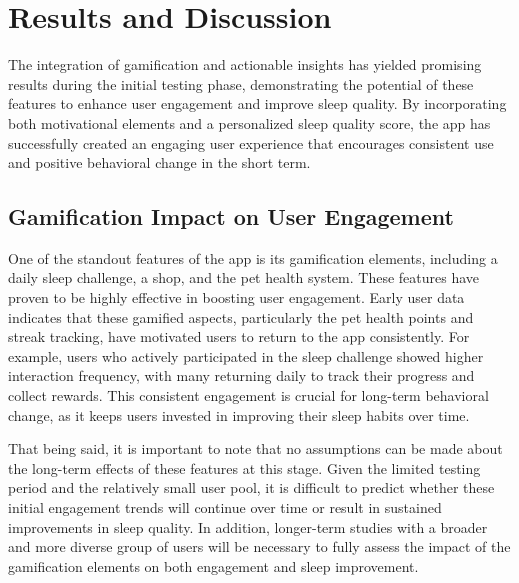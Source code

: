 \documentclass[10pt,twocolumn]{article}
\begin{document}
\section{Results and Discussion}

The integration of gamification and actionable insights has yielded promising results during the initial testing phase, demonstrating the potential of these features to enhance user engagement and improve sleep quality. By incorporating both motivational elements and a personalized sleep quality score, the app has successfully created an engaging user experience that encourages consistent use and positive behavioral change in the short term.

\subsection{Gamification Impact on User Engagement} One of the standout features of the app is its gamification elements, including a daily sleep challenge, a shop, and the pet health system. These features have proven to be highly effective in boosting user engagement. Early user data indicates that these gamified aspects, particularly the pet health points and streak tracking, have motivated users to return to the app consistently. For example, users who actively participated in the sleep challenge showed higher interaction frequency, with many returning daily to track their progress and collect rewards. This consistent engagement is crucial for long-term behavioral change, as it keeps users invested in improving their sleep habits over time.

That being said, it is important to note that no assumptions can be made about the long-term effects of these features at this stage. Given the limited testing period and the relatively small user pool, it is difficult to predict whether these initial engagement trends will continue over time or result in sustained improvements in sleep quality. In addition, longer-term studies with a broader and more diverse group of users will be necessary to fully assess the impact of the gamification elements on both engagement and sleep improvement.
\end{document}
